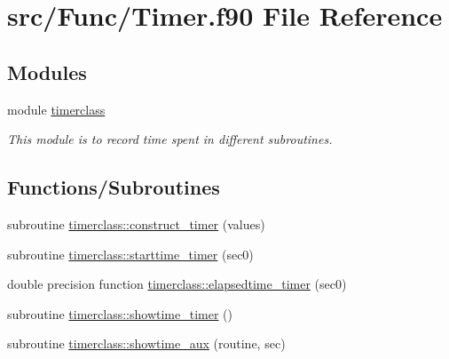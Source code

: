 \hypertarget{_timer_8f90}{}\section{src/\+Func/\+Timer.f90 File Reference}
\label{_timer_8f90}
\subsection*{Modules}
\begin{DoxyCompactItemize}
\item 
module \mbox{\hyperlink{namespacetimerclass}{timerclass}}
\begin{DoxyCompactList}\small\item\em This module is to record time spent in different subroutines. \end{DoxyCompactList}\end{DoxyCompactItemize}
\subsection*{Functions/\+Subroutines}
\begin{DoxyCompactItemize}
\item 
subroutine \mbox{\hyperlink{namespacetimerclass_a162c9c59b952268a3b7b544cff4f4295}{timerclass\+::construct\+\_\+timer}} (values)
\item 
subroutine \mbox{\hyperlink{namespacetimerclass_afb272bcdcff72d225c2df5862630025c}{timerclass\+::starttime\+\_\+timer}} (sec0)
\item 
double precision function \mbox{\hyperlink{namespacetimerclass_a3378d323d442f85aff95ab73cd13376d}{timerclass\+::elapsedtime\+\_\+timer}} (sec0)
\item 
subroutine \mbox{\hyperlink{namespacetimerclass_aa34d67fa57ad546ab7e1a7fb1643e9b0}{timerclass\+::showtime\+\_\+timer}} ()
\item 
subroutine \mbox{\hyperlink{namespacetimerclass_a3535b11970327778ddd27cee93c2288b}{timerclass\+::showtime\+\_\+aux}} (routine, sec)
\end{DoxyCompactItemize}
